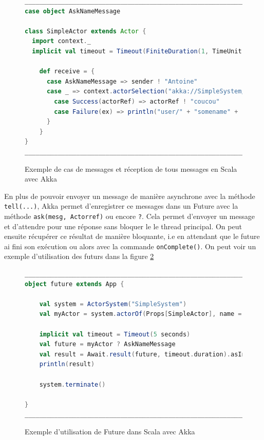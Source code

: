 \documentclass[11pt, a4paper]{article}
\begin{document}
\begin{figure}[ht]
\centering
\begin{lstlisting}[language=scala]
__________________________________________________________________________
case object AskNameMessage

class SimpleActor extends Actor {
  import context._
  implicit val timeout = Timeout(FiniteDuration(1, TimeUnit.SECONDS))
  
	def receive = {
	  case AskNameMessage => sender ! "Antoine"
	  case _ => context.actorSelection("akka://SimpleSystem/user/SimpleActor2").resolveOne().onComplete {
	    case Success(actorRef) => actorRef ! "coucou"
	    case Failure(ex) => println("user/" + "somename" + " does not exist")
	  }
	}
}
__________________________________________________________________________
\end{lstlisting}
\caption{Exemple de cas de messages et réception de tous messages en Scala avec Akka}
\label{cas_mesg}
\end{figure}

\par En plus de pouvoir envoyer un message de manière asynchrone avec la méthode \texttt{tell(...)}, Akka permet d'enregistrer ce messages dans un Future avec la méthode \texttt{ask(mesg, Actorref)} ou encore \texttt{?}. Cela permet d'envoyer un message et d'attendre pour une réponse sans bloquer le le thread principal. On peut ensuite récupérer ce résultat de manière bloquante, i.e en attendant que le future ai fini son exécution ou alors avec la commande \texttt{onComplete()}. On peut voir un exemple d'utilisation des futurs dans  la figure \ref{futur}
\newline 

\begin{figure}[ht]
\centering
\begin{lstlisting}[language=scala]
__________________________________________________________________________
object future extends App {

	val system = ActorSystem("SimpleSystem")
	val myActor = system.actorOf(Props[SimpleActor], name = "myActor")

	implicit val timeout = Timeout(5 seconds)
	val future = myActor ? AskNameMessage
	val result = Await.result(future, timeout.duration).asInstanceOf[String]
	println(result)

	system.terminate()

}
__________________________________________________________________________
\end{lstlisting}
\caption{Exemple d'utilisation de Future dans Scala avec Akka}
\label{futur}
\end{figure}
\end{document}
